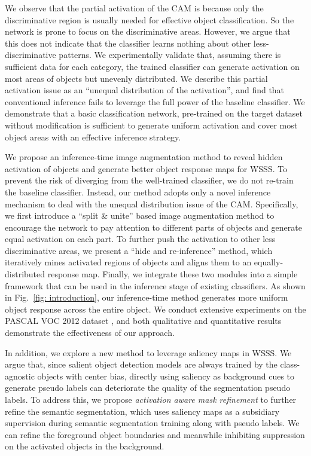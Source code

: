 \documentclass[10pt,twocolumn,letterpaper]{article}
\begin{document}
We observe that
the partial activation of the CAM is because only the discriminative region is usually needed for effective object classification.
So the network is prone to focus on the discriminative areas.
However, 
we argue that this does not indicate that the classifier learns nothing about other less-discriminative patterns. 
We experimentally validate that,
assuming there is
sufficient data for each category, the trained classifier can generate activation on most areas of objects but unevenly distributed. 
We describe this partial activation issue as an \enquote{unequal distribution of the activation}, and find that
conventional inference fails to leverage the full power of the baseline classifier. We demonstrate
that
a basic classification network, pre-trained on the target dataset without
modification is sufficient
to generate uniform activation and cover most object areas with an effective inference strategy. 


We propose an inference-time 
image augmentation method
to reveal hidden activation of
objects and generate better object response maps for WSSS.
To prevent the risk of diverging from the well-trained classifier, we do not
re-train the baseline classifier. Instead, our method adopts only a novel inference mechanism to deal with the unequal distribution issue of the CAM.
Specifically, we first introduce a \enquote{split \& unite} based image augmentation method to encourage the network to pay attention to different parts of objects and generate equal activation on each part.
To further push the activation to other less discriminative areas, we present a \enquote{hide and re-inference} method, which iteratively mines activated regions of objects and aligns them to an equally-distributed response map. 
Finally, we integrate these two modules into a simple framework that can be used in the inference stage of existing classifiers.
As shown in Fig.~\ref{fig: introduction}, our inference-time method generates more
uniform object response across the entire object.
We conduct extensive experiments on the PASCAL VOC 2012 dataset \cite{everingham2010pascal}, and both qualitative and quantitative results demonstrate the effectiveness of our approach.

In addition, we explore a new method to leverage saliency maps in WSSS. We argue that, since salient object detection models are always trained by the class-agnostic objects with center bias,
directly using saliency as background cues to generate pseudo labels can deteriorate the quality of the
segmentation 
pseudo labels.
To address this,
we propose \emph{activation aware mask refinement} to further refine the semantic segmentation,
which
uses saliency maps as a subsidiary supervision during semantic segmentation training along with pseudo labels. 
We can refine the foreground object boundaries and meanwhile inhibiting suppression on the activated objects in the background. 
\end{document}
